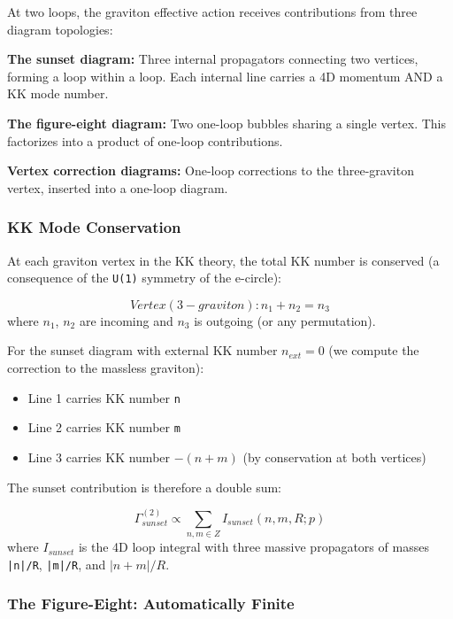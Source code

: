 \documentclass[aps,prd,preprint,superscriptaddress,longbibliography,floatfix]{revtex4-2}
\theoremstyle{remark}
\begin{document}
At two loops, the graviton effective action receives contributions from three diagram topologies:

\textbf{The sunset diagram:} Three internal propagators connecting two vertices, forming a loop within a loop. Each internal line carries a 4D momentum AND a KK mode number.

\textbf{The figure-eight diagram:} Two one-loop bubbles sharing a single vertex. This factorizes into a product of one-loop contributions.

\textbf{Vertex correction diagrams:} One-loop corrections to the three-graviton vertex, inserted into a one-loop diagram.


\subsubsection{KK Mode Conservation}

At each graviton vertex in the KK theory, the total KK number is conserved (a consequence of the \texttt{U(1)} symmetry of the e-circle):


\begin{equation}
    Vertex (3-graviton): n_{1} + n_{2} = n_{3}
\end{equation}
where $n_{1}$, $n_{2}$ are incoming and $n_{3}$ is outgoing (or any permutation).

For the sunset diagram with external KK number $n_{ext} = 0$ (we compute the correction to the massless graviton):


\begin{itemize}
  \item Line 1 carries KK number \texttt{n}
  \item Line 2 carries KK number \texttt{m}
  \item Line 3 carries KK number $-(n + m)$ (by conservation at both vertices)
\end{itemize}

The sunset contribution is therefore a double sum:


\begin{equation}
    \Gamma^{(2)}_{sunset} \propto \sum_{n,m \in Z} I_{sunset}(n, m, R; p)
\end{equation}
where $I_{sunset}$ is the 4D loop integral with three massive propagators of masses \texttt{|n|/R}, \texttt{|m|/R}, and $|n+m|/R$.


\subsubsection{The Figure-Eight: Automatically Finite}
\end{document}
